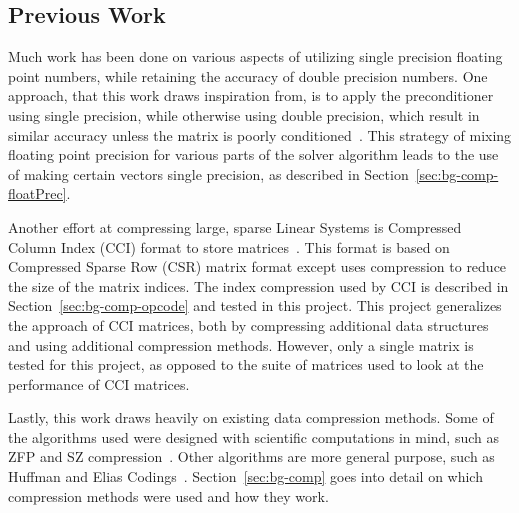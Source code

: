 \subsection{Previous Work}
Much work has been done on various aspects of utilizing single precision floating point numbers, while retaining the accuracy of double precision numbers.
One approach, that this work draws inspiration from, is to apply the preconditioner using single precision, while otherwise using double precision, which result in similar accuracy unless the matrix is poorly conditioned~\cite{Buttari:2008:mixedPrec, Hogg:2010:multiplePasses}.
This strategy of mixing floating point precision for various parts of the solver algorithm leads to the use of making certain vectors single precision, as described in Section~\ref{sec:bg-comp-floatPrec}.

Another effort at compressing large, sparse Linear Systems is Compressed Column Index (CCI) format to store matrices~\cite{Lawlor:2013:compression}.
This format is based on Compressed Sparse Row (CSR) matrix format except uses compression to reduce the size of the matrix indices.
The index compression used by CCI is described in Section~\ref{sec:bg-comp-opcode} and tested in this project.
This project generalizes the approach of CCI matrices, both by compressing additional data structures and using additional compression methods.
However, only a single matrix is tested for this project, as opposed to the suite of matrices used to look at the performance of CCI matrices.

Lastly, this work draws heavily on existing data compression methods.
Some of the algorithms used were designed with scientific computations in mind, such as ZFP and SZ compression~\cite{Lindstrom:2014:zfp,Di:2016:SZ}.
Other algorithms are more general purpose, such as Huffman and Elias Codings~\cite{Huffman:1952:coding,Elias:1975:codeword}.
Section~\ref{sec:bg-comp} goes into detail on which compression methods were used and how they work.